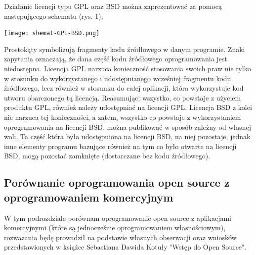\documentclass{article}
\begin{document}
Działanie licencji typu GPL oraz BSD można zaprezentować za pomocą następującego schematu (rys. 1);
\begin{center}
        \texttt{[image: shemat-GPL-BSD.png]}
\end{center}
Prostokąty symbolizują fragmenty kodu źródłowego w danym programie. Znaki zapytania oznaczają, że dana część kodu źródłowego oprogramowania jest niedostępna. Licencja GPL narzuca konieczność stosowania swoich praw nie tylko w stosunku do wykorzystanego i udostępnianego wcześniej fragmentu kodu źródłowego, lecz również w stosunku do całej aplikacji, która wykorzystuje kod utworu obarczonego tą licencją.
Reasumując: wszystko, co powstaje z użyciem produktu GPL, również należy udostępniać na licencji GPL. Licencja BSD z kolei nie narzuca tej konieczności, a zatem, wszystko co powstaje z wykorzystaniem oprogramowania na licencji BSD, można publikować w sposób zależny od własnej woli.
Ta część która była udostępniona na licencji BSD, na niej pozostaje, jednak inne elementy programu bazujące również na tym co było otwarte na licencji BSD, mogą pozostać zamknięte (dostarczane bez kodu źródłowego)\cite{Kotula}.

\subsection{Porównanie oprogramowania open source z oprogramowaniem komercyjnym}

W tym podrozdziale porównam oprogramowanie open source z aplikacjami komercyjnymi (które są jednocześnie oprogramowaniem własnościowym), rozważania będę prowadził na podstawie własnych obserwacji oraz wniosków przedstawionych w książce Sebastiana Dawida Kotuły "Wstęp do Open Source"\cite{Kotula}.
\end{document}
